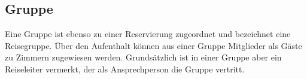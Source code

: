 \documentclass[../../Pflichtenheft.tex]{subfiles}
\begin{document}
    \subsection{Gruppe}
    Eine Gruppe ist ebenso zu einer Reservierung zugeordnet und bezeichnet eine Reisegruppe.
    Über den Aufenthalt können aus einer Gruppe Mitglieder als Gäste zu Zimmern zugewiesen werden. Grundsätzlich ist in einer
    Gruppe aber ein Reiseleiter vermerkt, der als Ansprechperson die Gruppe vertritt.
\end{document}
